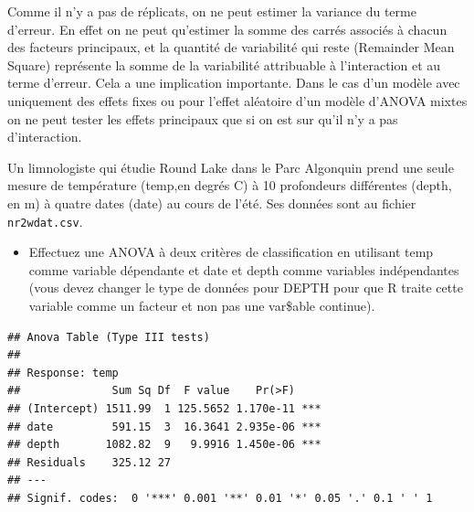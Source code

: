 \documentclass[12pt,]{book}
\makeatletter
\newenvironment{Shaded}{\begin{snugshade}}{\end{snugshade}}
\newcommand{\DataTypeTok}[1]{\textcolor[rgb]{0.27,0.27,0.27}{#1}}
\newcommand{\DecValTok}[1]{\textcolor[rgb]{0.06,0.06,0.06}{#1}}
\newcommand{\KeywordTok}[1]{\textcolor[rgb]{0.27,0.27,0.27}{\textbf{#1}}}
\newcommand{\NormalTok}[1]{#1}
\newcommand{\OperatorTok}[1]{\textcolor[rgb]{0.43,0.43,0.43}{\textbf{#1}}}
\newcommand{\StringTok}[1]{\textcolor[rgb]{0.5,0.5,0.5}{#1}}
\providecommand{\tightlist}{%
  \setlength{\itemsep}{0pt}\setlength{\parskip}{0pt}}
\newenvironment{kframe}{%
\medskip{}
\setlength{\fboxsep}{.8em}
 \def\at@end@of@kframe{}%
 \ifinner\ifhmode%
  \def\at@end@of@kframe{\end{minipage}}%
  \begin{minipage}{\columnwidth}%
 \fi\fi%
 \def\FrameCommand##1{\hskip\@totalleftmargin \hskip-\fboxsep
 \colorbox{shadecolor}{##1}\hskip-\fboxsep
     \hskip-\linewidth \hskip-\@totalleftmargin \hskip\columnwidth}%
 \MakeFramed {\advance\hsize-\width
   \@totalleftmargin\z@ \linewidth\hsize
   \@setminipage}}%
 {\par\unskip\endMakeFramed%
 \at@end@of@kframe}
\newenvironment{rmdblock}[1]
  {
  \begin{itemize}
  \renewcommand{\labelitemi}{
    \raisebox{-.7\height}[0pt][0pt]{
      {\setkeys{Gin}{width=3em,keepaspectratio}\texttt{[image: images/\#1]}}
    }
  }
  \setlength{\fboxsep}{1em}
  \begin{kframe}
  \item
  }
  {
  \end{kframe}
  \end{itemize}
  }
\newenvironment{rmdwarning}
  {\begin{rmdblock}{warning}}
  {\end{rmdblock}}
\makeatother
\begin{document}
\begin{rmdwarning}
Comme il n'y a pas de réplicats, on ne peut estimer la variance du terme d'erreur. En effet on ne peut qu'estimer la somme des carrés associés à chacun des facteurs principaux, et la quantité de variabilité qui reste (Remainder Mean Square) représente la somme de la variabilité attribuable à l'interaction et au terme d'erreur. Cela a une implication importante. Dans le cas d'un modèle avec uniquement des effets fixes ou pour l'effet aléatoire d'un modèle d'ANOVA mixtes on ne peut tester les effets principaux que si on est sur qu'il n'y a pas d'interaction.
\end{rmdwarning}

Un limnologiste qui étudie Round Lake dans le Parc Algonquin prend une seule mesure de température (temp,en degrés C) à 10 profondeurs différentes (depth, en m) à quatre dates (date) au cours de l'été. Ses données sont au fichier \texttt{nr2wdat.csv}.

\begin{itemize}
\tightlist
\item
  Effectuez une ANOVA à deux critères de classification en utilisant temp comme variable dépendante et date et depth comme variables indépendantes (vous devez changer le type de données pour DEPTH pour que R traite cette variable comme un facteur et non pas une var\$able continue).
\end{itemize}

\begin{Shaded}
\end{Shaded}

\begin{verbatim}
## Anova Table (Type III tests)
## 
## Response: temp
##              Sum Sq Df  F value    Pr(>F)    
## (Intercept) 1511.99  1 125.5652 1.170e-11 ***
## date         591.15  3  16.3641 2.935e-06 ***
## depth       1082.82  9   9.9916 1.450e-06 ***
## Residuals    325.12 27                       
## ---
## Signif. codes:  0 '***' 0.001 '**' 0.01 '*' 0.05 '.' 0.1 ' ' 1
\end{verbatim}
\end{document}
